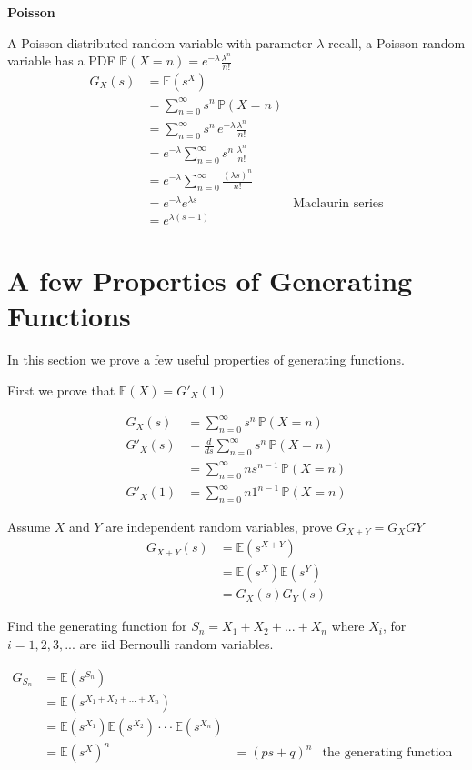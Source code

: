 \documentclass[11pt]{article}
\begin{document}
{\bf Poisson}

A Poisson distributed random variable with parameter $\lambda$ recall, a Poisson random variable has a PDF $\mathbb{P}(X=n) = e^{-\lambda}\frac{\lambda^n}{n!}$
\begin{align}
G_X(s) &= \mathbb{E}(s^X) \\
&= \sum_{n=0}^{\infty} s^n\, \mathbb{P}(X=n) \\
&= \sum_{n=0}^{\infty} s^n\, e^{-\lambda}\frac{\lambda^n}{n!} \\ 
&= e^{-\lambda} \sum_{n=0}^{\infty} s^n\, \frac{\lambda^n}{n!} \\ 
&= e^{-\lambda} \sum_{n=0}^{\infty} \frac{(\lambda s)^n}{n!} \\
&= e^{-\lambda} e^{\lambda s} & \text{Maclaurin series}\\
&= e^{\lambda(s - 1)}
\end{align}

\section{A few Properties of Generating Functions}

In this section we prove a few useful properties of generating functions.

First we prove that $\mathbb{E}(X) = {G'}_{X}(1)$

\begin{align}
G_X(s) &= \sum_{n=0}^{\infty} s^n\, \mathbb{P}(X=n) \\
{G'}_X(s) &=  \frac{d}{ds} \sum_{n=0}^{\infty} s^n\, \mathbb{P}(X=n) \\
&= \sum_{n=0}^{\infty} n{s}^{n-1}\, \mathbb{P}(X=n) \\
{G'}_X(1) &= \sum_{n=0}^{\infty} n {1}^{n-1}\, \mathbb{P}(X=n)
\end{align}

Assume $X$ and $Y$ are independent random variables, prove $G_{X+Y} = G_{X}G{Y}$
\begin{align}
G_{X+Y}(s) &= \mathbb{E}(s^{X+Y}) \\
&= \mathbb{E}(s^X)\mathbb{E}(s^Y) \\
&= G_X(s)G_Y(s)
\end{align}

Find the generating function for $S_n = X_1 + X_2 + ... +X_n$ where $X_i$, for $i = 1,2,3,...$ are iid Bernoulli random variables.

\begin{align}
G_{S_n} &= \mathbb{E}(s^{S_n}) \\
&= \mathbb{E}(s^{X_1 + X_2 + ... + X_n}) \\
&= \mathbb{E}(s^{X_1}) \mathbb{E}(s^{X_2}) \cdot \cdot \cdot \mathbb{E}(s^{X_n}) \\
&= \mathbb{E}(s^X)^n
&= (ps + q)^n & \text{the generating function for a Bernoulli random variable} 
\end{align}
\end{document}
